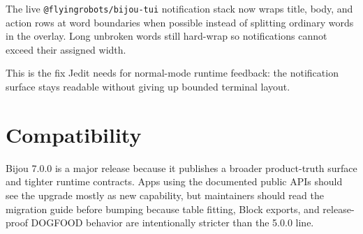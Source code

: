 The live \texttt{@\allowbreak{}f\allowbreak{}l\allowbreak{}y\allowbreak{}i\allowbreak{}n\allowbreak{}g\allowbreak{}r\allowbreak{}o\allowbreak{}b\allowbreak{}o\allowbreak{}t\allowbreak{}s\allowbreak{}/\allowbreak{}b\allowbreak{}i\allowbreak{}j\allowbreak{}o\allowbreak{}u\allowbreak{}-\allowbreak{}t\allowbreak{}u\allowbreak{}i} notification stack now wraps title, body, and action rows at word boundaries when possible instead of splitting ordinary words in the overlay. Long unbroken words still hard-wrap so notifications cannot exceed their assigned width.

This is the fix Jedit needs for normal-mode runtime feedback: the notification surface stays readable without giving up bounded terminal layout.

\section{Compatibility}\label{record-281-compatibility}

Bijou 7.0.0 is a major release because it publishes a broader product-truth surface and tighter runtime contracts. Apps using the documented public APIs should see the upgrade mostly as new capability, but maintainers should read the migration guide before bumping because table fitting, Block exports, and release-proof DOGFOOD behavior are intentionally stricter than the 5.0.0 line.

